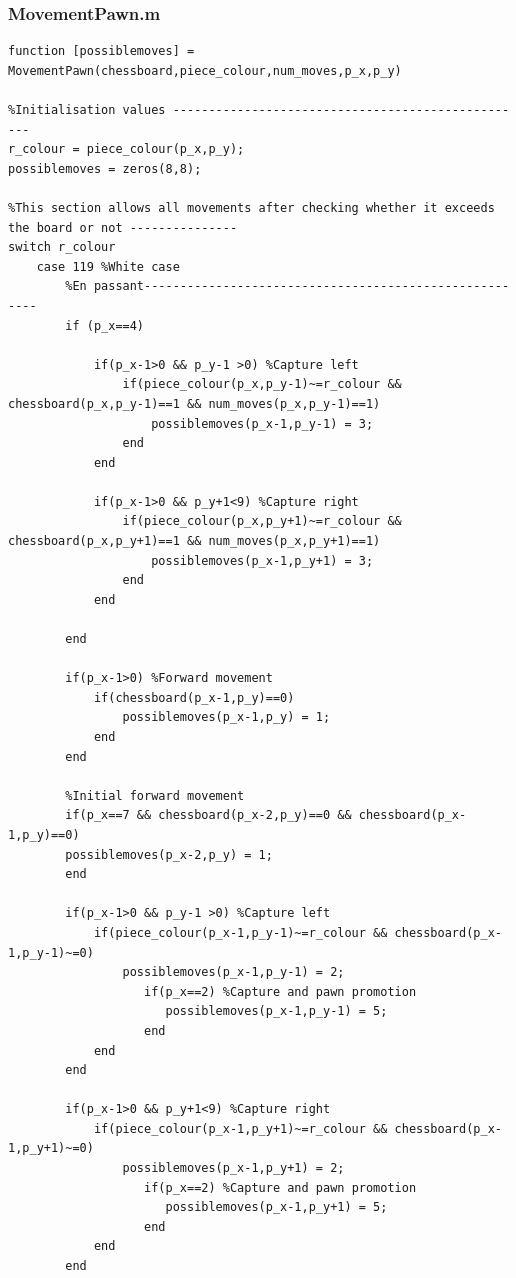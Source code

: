\documentclass[11pt,a4paper]{article}
\begin{document}
\subsubsection{MovementPawn.m}
\begin{lstlisting}
function [possiblemoves] = MovementPawn(chessboard,piece_colour,num_moves,p_x,p_y)

%Initialisation values --------------------------------------------------
r_colour = piece_colour(p_x,p_y);
possiblemoves = zeros(8,8);

%This section allows all movements after checking whether it exceeds the board or not ---------------
switch r_colour
    case 119 %White case
        %En passant-------------------------------------------------------
        if (p_x==4)
            
            if(p_x-1>0 && p_y-1 >0) %Capture left
                if(piece_colour(p_x,p_y-1)~=r_colour && chessboard(p_x,p_y-1)==1 && num_moves(p_x,p_y-1)==1)
                    possiblemoves(p_x-1,p_y-1) = 3;
                end
            end

            if(p_x-1>0 && p_y+1<9) %Capture right
                if(piece_colour(p_x,p_y+1)~=r_colour && chessboard(p_x,p_y+1)==1 && num_moves(p_x,p_y+1)==1)
                    possiblemoves(p_x-1,p_y+1) = 3;
                end    
            end
        
        end
        
        if(p_x-1>0) %Forward movement
            if(chessboard(p_x-1,p_y)==0)
                possiblemoves(p_x-1,p_y) = 1;
            end
        end
        
        %Initial forward movement
        if(p_x==7 && chessboard(p_x-2,p_y)==0 && chessboard(p_x-1,p_y)==0)
        possiblemoves(p_x-2,p_y) = 1;
        end

        if(p_x-1>0 && p_y-1 >0) %Capture left
            if(piece_colour(p_x-1,p_y-1)~=r_colour && chessboard(p_x-1,p_y-1)~=0)
                possiblemoves(p_x-1,p_y-1) = 2;
                   if(p_x==2) %Capture and pawn promotion
                      possiblemoves(p_x-1,p_y-1) = 5;
                   end
            end
        end

        if(p_x-1>0 && p_y+1<9) %Capture right
            if(piece_colour(p_x-1,p_y+1)~=r_colour && chessboard(p_x-1,p_y+1)~=0)
                possiblemoves(p_x-1,p_y+1) = 2;
                   if(p_x==2) %Capture and pawn promotion
                      possiblemoves(p_x-1,p_y+1) = 5;
                   end
            end
        end    
        

\end{lstlisting}
\end{document}
